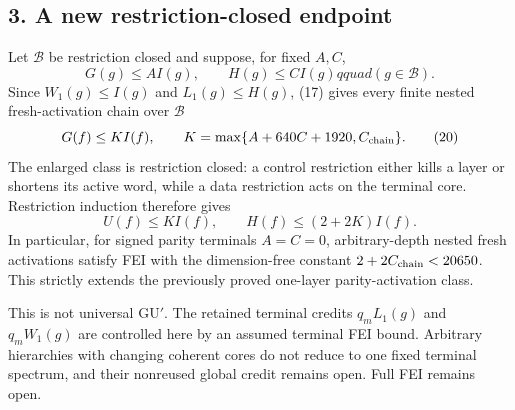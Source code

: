 \subsection*{3. A new restriction-closed endpoint}

Let $\mathcal B$ be restriction closed and suppose, for fixed $A,C$,
\[
 G(g)\leq A I(g),\qquad H(g)\leq C I(g)qquad(g\in\mathcal B).
\tag{19}
\]
Since $W_1(g)\leq I(g)$ and $L_1(g)\leq H(g)$, (17) gives every finite
nested fresh-activation chain over $\mathcal B$
\[
 G(f)\leq K I(f),\qquad
 K=\max\{A+640C+1920,C_{\rm chain}\}.
\tag{20}
\]
The enlarged class is restriction closed: a control restriction either
kills a layer or shortens its active word, while a data restriction acts
on the terminal core.  Restriction induction therefore gives
\[
 U(f)\leq KI(f),\qquad H(f)\leq(2+2K)I(f).
\tag{21}
\]
In particular, for signed parity terminals $A=C=0$, arbitrary-depth
nested fresh activations satisfy FEI with the dimension-free constant
$2+2C_{\rm chain}<20650$.  This strictly extends the previously proved
one-layer parity-activation class.

This is not universal GU$'$.  The retained terminal credits
$q_mL_1(g)$ and $q_mW_1(g)$ are controlled here by an assumed terminal
FEI bound.  Arbitrary hierarchies with changing coherent cores do not
reduce to one fixed terminal spectrum, and their nonreused global credit
remains open.  Full FEI remains open.
